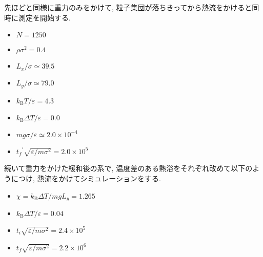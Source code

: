 先ほどと同様に重力のみをかけて, 粒子集団が落ちきってから熱流をかけると同時に測定を開始する.

\begin{itemize}
  \item $N = 1250$
  \item $\rho \sigma^2 = 0.4$
  \item $L_x / \sigma \simeq 39.5$
  \item $L_y / \sigma \simeq 79.0$
  \item $k_{\text{B}} T/\varepsilon = 4.3$
  \item $k_{\text{B}} \Delta T/\varepsilon = 0.0$
  \item $mg\sigma/\varepsilon \simeq 2.0 \times 10^{-4}$
  \item ${t_f}^{\prime} \sqrt{\varepsilon / m \sigma^2} = 2.0 \times 10^{5}$
\end{itemize}

続いて重力をかけた緩和後の系で, 温度差のある熱浴をそれぞれ改めて以下のようにつけ, 熱流をかけてシミュレーションをする. 

\begin{itemize}
  \item $\chi = k_{\text{B}}\Delta T / mg L_y = 1.265$
  \item $k_{\text{B}} \Delta T/\varepsilon = 0.04$
  \item $t_i \sqrt{\varepsilon / m \sigma^2} = 2.4 \times 10^{5}$
  \item $t_f \sqrt{\varepsilon / m \sigma^2} = 2.2 \times 10^{6}$
\end{itemize}

